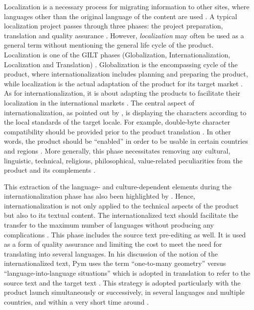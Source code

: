\documentclass[output=paper]{langsci/langscibook}
\begin{document}
Localization is a necessary process for migrating information to other sites, where languages other than the original language of the content are used \parencite[28--29]{cronin06}. A typical localization project passes through three phases: the project preparation, translation and quality assurance \parencite[114]{quah06}. However, \textit{localization} may often be used as a general term without mentioning the general life cycle of the product. Localization is one of the GILT phases (Globalization, Internationalization, Localization and Translation) \parencite{munday08}. Globalization is the encompassing cycle of the product, where internationalization includes planning and preparing the product, while localization is the actual adaptation of the product for its target market \parencite{anasch10}. As for internationalization, it is about adapting the products to facilitate their localization in the international markets \parencite{esselink03}. The central aspect of internationalization, as pointed out by \textcite{esselink00}, is displaying the characters according to the local standards of the target locale. For example, double-byte character compatibility should be provided prior to the product translation \parencite[3]{esselink00}. In other words, the product should be \enquote{enabled} in order to be usable in certain countries and regions \parencite[2]{esselink98}. More generally, this phase necessitates removing any cultural, linguistic, technical, religious, philosophical, value-related peculiarities from the product and its complements \parencite{gouadec03}.

This extraction of the language- and culture-dependent elements during the internationalization phase has also been highlighted by \textcite{schaeler07}. Hence, internationalization is not only applied to the technical aspects of the product but also to its textual content. The internationalized text should facilitate the transfer to the maximum number of languages without producing any complications \parencite[26]{jimenez13}. This phase includes the source text pre-editing as well. It is used as a form of quality assurance and limiting the cost to meet the need for translating into several languages. In his discussion of the notion of the internationalized text, Pym uses the term \enquote{one-to-many geometry} versus \enquote{language-into-language situations} which is adopted in translation to refer to the source text and the target text \parencite*{pym06}. This strategy is adopted particularly with the product launch simultaneously or successively, in several languages and multiple countries, and within a very short time around \parencite[45]{quah06}.
\end{document}
